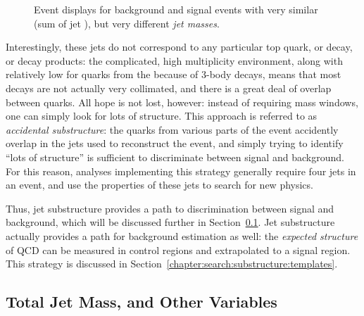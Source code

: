 
\begin{figure}
\centering
{}
\label{fig:search:motivation:event-displays}
\caption{Event displays for background and signal events with very similar \Ht (sum of jet \pt), but very different \textit{jet masses}.}
\end{figure}


Interestingly, these \largeR jets do not correspond to any particular top quark, or \lsp decay, or \gl decay products: the complicated, high multiplicity environment, along with relatively low \pt for quarks from the \lsp because of 3-body decays, means that most decays are not actually very collimated, and there is a great deal of overlap between quarks. All hope is not lost, however: instead of requiring mass windows, one can simply look for lots of structure. This approach is referred to as \textit{accidental substructure}: the quarks from various parts of the event accidently overlap in the \largeR jets used to reconstruct the event, and simply trying to identify ``lots of structure'' is sufficient to discriminate between signal and background. For this reason, analyses implementing this strategy generally require four \largeR jets in an event, and use the properties of these jets to search for new physics. 

Thus, jet substructure provides a path to discrimination between signal and background, which will be discussed further in Section~\ref{chapter:search:substructure:mj}. Jet substructure actually provides a path for background estimation as well: the \textit{expected structure} of QCD can be measured in control regions and extrapolated to a signal region. This strategy is discussed in Section~\ref{chapter:search:substructure:templates}. 

\subsection{Total Jet Mass, and Other Variables}
	\label{chapter:search:substructure:mj}

